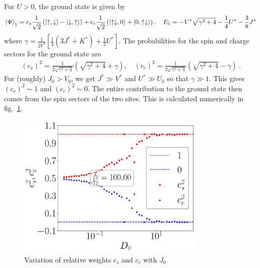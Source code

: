 \documentclass{report}
\numberwithin{equation}{section}
\begin{document}
For \(U>0\), the ground state is given by
\begin{gather}
	\label{gstate}
	\ket{\Psi}_\text{1} = c_s \frac{1}{\sqrt 2}\left(\ket{\uparrow, \downarrow} - \ket{\downarrow, \uparrow}\right) + c_c \frac{1}{\sqrt 2}\left(\ket{\uparrow\downarrow, 0} + \ket{0, \uparrow\downarrow}\right), \quad E_1 =  -V^*\sqrt{\gamma^2 + 4} -\frac{1}{4}U^* - \frac{3}{8}{J^*}
\end{gather}
where $\gamma = \frac{1}{2{V^*}}\left[ \frac{1}{4}\left( 3J^* + K^* \right) + \frac{1}{2}U^* \right]$. The probabilities for the spin and charge sectors for the ground state are
\begin{equation}\begin{aligned}
	\label{coeff_def}
	\left(c_s\right)^2 = \frac{1}{2\sqrt{\gamma^2 + 4}}\left(\sqrt{\gamma^2 + 4} + \gamma\right), \quad \left(c_c \right)^2 = \frac{1}{2\sqrt{\gamma^2 + 4}}\left(\sqrt{\gamma^2 + 4} - \gamma\right)~.
\end{aligned}\end{equation}
For (roughly) \(J_0 > V_0\), we get \(J^* \gg V^*\) and \(U^* \gg U_0\) so that \(\gamma \gg 1\). This gives \(\left( c_s \right) ^2 \sim 1\) and \(\left( c_c \right) ^2 \sim 0\). The entire contribution to the ground state then comes from the spin sectors of the two sites. This is calculated numerically in fig.~\ref{cs_cc}.
\begin{figure}[htpb]
	\centering
	\includegraphics[width=0.8\textwidth]{../figures/coeffs_vs_J.pdf}
	\caption{Variation of relative weights \(c_s\) and \(c_c\) with \(J_0\)}
	\label{cs_cc}
\end{figure}
\end{document}
